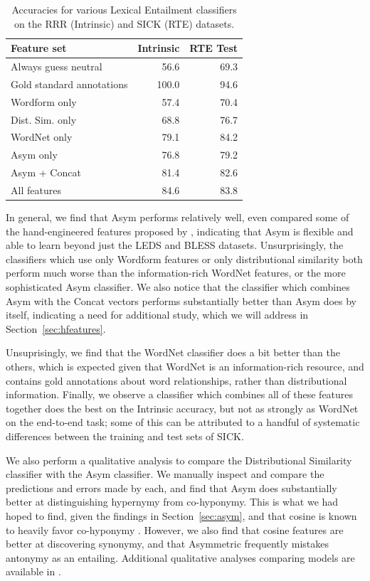 \documentclass[12pt]{article}
\begin{document}
\begin{table}
\centering
\begin{tabular}{|lrr|}
    \hline
    {\bf Feature set} & {\bf Intrinsic} & {\bf RTE Test}\\
    \hline
    Always guess neutral & 56.6 & 69.3 \\
    Gold standard annotations&100.0 & 94.6 \\
    \hline
    Wordform only        & 57.4 & 70.4 \\
    Dist. Sim. only      & 68.8 & 76.7 \\
    WordNet only         & 79.1 & 84.2 \\
    Asym only            & 76.8 & 79.2 \\
    Asym + Concat        & 81.4 & 82.6 \\
    \hline
    All features         & 84.6 & 83.8 \\
    \hline
\end{tabular}
\caption{Accuracies for various Lexical Entailment classifiers on the RRR (Intrinsic) and SICK (RTE) datasets.}
\label{tab:evallexical}
\end{table}

In general, we find that Asym performs relatively well, even compared some of
the hand-engineered features proposed by , indicating
that Asym is flexible and able to learn beyond just the LEDS and BLESS datasets.
Unsurprisingly, the classifiers which use only Wordform features or only
distributional similarity both perform much worse than the information-rich
WordNet features, or the more sophisticated Asym classifier.
We also notice that the classifier which combines Asym with the Concat
vectors performs substantially better than Asym does by itself, indicating
a need for additional study, which we will address in
Section~\ref{sec:hfeatures}.

Unsuprisingly, we find that the WordNet classifier does a bit better than the
others, which is expected given that WordNet is an information-rich resource,
and contains gold annotations about word relationships, rather than
distributional information.  Finally, we observe a classifier which combines
all of these features together does the best on the Intrinsic accuracy, but not
as strongly as WordNet on the end-to-end task; some of this can be attributed
to a handful of systematic differences between the training and test sets of
SICK.

We also perform a qualitative analysis to compare the Distributional Similarity
classifier with the Asym classifier. We manually inspect and compare the
predictions and errors made by each, and find that Asym does substantially
better at distinguishing hypernymy from co-hyponymy.  This is what we had hoped
to find, given the findings in Section~\ref{sec:asym}, and that cosine is known
to heavily favor co-hyponymy \cite{baroni:2011:gems}.  However, we also find
that cosine features are better at discovering synonymy, and that Asymmetric
frequently mistakes antonymy as an entailing. Additional qualitative analyses
comparing models are available in .
\end{document}
